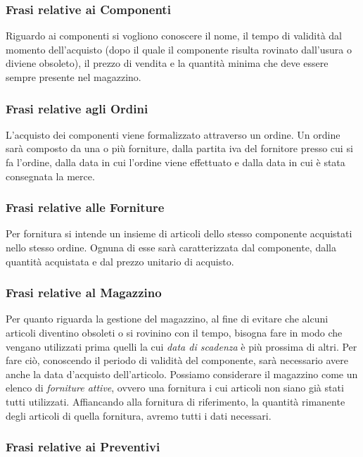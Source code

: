 		\subsubsection{Frasi relative ai Componenti}
			
			Riguardo ai componenti si vogliono conoscere il nome, il tempo di validità dal momento dell'acquisto (dopo il quale il componente risulta rovinato dall'usura o diviene obsoleto), il prezzo di vendita e la quantità minima che deve essere sempre presente nel magazzino.
			
		\subsubsection{Frasi relative agli Ordini}
		
			L'acquisto dei componenti viene formalizzato attraverso un ordine. Un ordine sarà composto da una o più forniture, dalla partita iva del fornitore presso cui si fa l'ordine, dalla data in cui l'ordine viene effettuato e dalla data in cui è stata consegnata la merce.
		
		\subsubsection{Frasi relative alle Forniture}
		
			Per fornitura si intende un insieme di articoli dello stesso componente acquistati nello stesso ordine. Ognuna di esse sarà caratterizzata dal componente, dalla quantità acquistata e dal prezzo unitario di acquisto.
			
		\subsubsection{Frasi relative al Magazzino}
			
			Per quanto riguarda la gestione del magazzino, al fine di evitare che alcuni articoli diventino obsoleti o si rovinino con il tempo, bisogna fare in modo che vengano utilizzati prima quelli la cui \emph{data di scadenza} è più prossima di altri. Per fare ciò, conoscendo il periodo di validità del componente, sarà necessario avere anche la data d'acquisto dell'articolo.
			Possiamo considerare il magazzino come un elenco di \emph{forniture attive}, ovvero una fornitura i cui articoli non siano già stati tutti utilizzati. Affiancando alla fornitura di riferimento, la quantità rimanente degli articoli di quella fornitura, avremo tutti i dati necessari.
			
		\subsubsection{Frasi relative ai Preventivi}
		\label{sec:frasi_preventivi}
			

